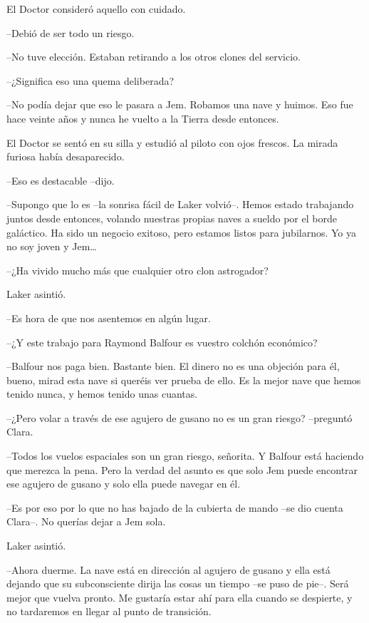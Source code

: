 {El Doctor consideró aquello con cuidado.}

{--Debió de ser todo un riesgo.}

{--No tuve elección. Estaban retirando a los otros clones del servicio.}

{--¿Significa eso una quema deliberada?}

{--No podía dejar que eso le pasara a Jem. Robamos una nave y huimos. Eso
fue hace veinte años y nunca he vuelto a la Tierra desde entonces.}

{El Doctor se sentó en su silla y estudió al piloto con ojos frescos. La
mirada furiosa había desaparecido.}

{--Eso es destacable --dijo.}

{--Supongo que lo es --la sonrisa fácil de Laker volvió--. Hemos estado
 trabajando juntos desde entonces, volando nuestras propias naves a
 sueldo por el borde galáctico. Ha sido un negocio exitoso, pero estamos
 listos para jubilarnos. Yo ya no soy joven y Jem\ldots{}}

{--¿Ha vivido mucho más que cualquier otro clon astrogador?}

{Laker asintió.}

{--Es hora de que nos asentemos en algún lugar.}

{--¿Y este trabajo para Raymond Balfour es vuestro colchón económico?}

{--Balfour nos paga bien. Bastante bien. El dinero no es una objeción
 para él, bueno, mirad esta nave si queréis ver prueba de ello. Es la
mejor nave que hemos tenido nunca, y hemos tenido unas cuantas.}

{--¿Pero volar a través de ese agujero de gusano no es un gran riesgo?
--preguntó Clara.}

{--Todos los vuelos espaciales son un gran riesgo, señorita. Y Balfour
 está haciendo que merezca la pena. Pero la verdad del asunto es que solo
 Jem puede encontrar ese agujero de gusano y solo ella puede navegar en
él.}

{--Es por eso por lo que no has bajado de la cubierta de mando --se dio
cuenta Clara--. No querías dejar a Jem sola.}

{Laker asintió.}

{--Ahora duerme. La nave está en dirección al agujero de gusano y ella
 está dejando que su subconsciente dirija las cosas un tiempo --se puso
 de pie--. Será mejor que vuelva pronto. Me gustaría estar ahí para ella
cuando se despierte, y no tardaremos en llegar al punto de transición.}

